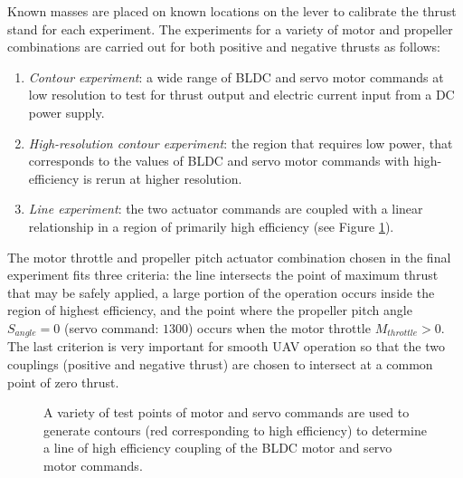 \documentclass[twocolumn,letterpaper]{IEEEAerospaceCLS}  %
\begin{document}
Known masses are placed on known locations on the lever to calibrate the thrust stand for each experiment. The experiments for a variety of motor and propeller combinations are carried out for both positive and negative thrusts as follows:
\begin{enumerate}
\item \textit{Contour experiment}: a wide range of BLDC and servo motor commands at low resolution to test for thrust output and electric current input from a DC power supply.%
\item \textit{High-resolution contour experiment}: the region that requires low power, that corresponds to the values of BLDC and servo motor commands with high-efficiency is rerun at higher resolution.
\item \textit{Line experiment}: the two actuator commands are coupled with a linear relationship in a region of primarily high efficiency (see Figure \ref{ContoursThrustServo}).
\end{enumerate}
The motor throttle and propeller pitch actuator combination chosen in the final experiment fits three criteria: the line intersects the point of maximum thrust that may be safely applied, a large portion of the operation occurs inside the region of highest efficiency, and the point where the propeller pitch angle $S_{angle}=0$ (servo command: $1300$) occurs when the motor throttle $M_{throttle}>0$. The last criterion is very important for smooth UAV operation so that the two couplings (positive and negative thrust) are chosen to intersect at a common point of zero thrust.

\begin{figure}
\centerline{
	}
\caption{A variety of test points of motor and servo commands are used to generate contours (red corresponding to high efficiency) to determine a line of high efficiency coupling of the BLDC motor and servo motor commands.}
\label{ContoursThrustServo}
\end{figure}
\end{document}
